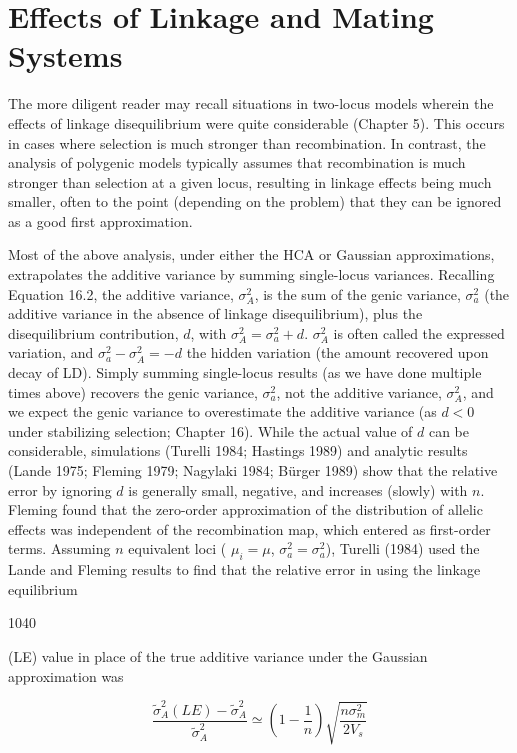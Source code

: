 \documentclass{article}
\begin{document}
\section{Effects of Linkage and Mating Systems}
The more diligent reader may recall situations in two-locus models wherein the effects of linkage disequilibrium were quite considerable (Chapter 5). This occurs in cases where selection is much stronger than recombination. In contrast, the analysis of polygenic models typically assumes that recombination is much stronger than selection at a given locus, resulting in linkage effects being much smaller, often to the point (depending on the problem) that they can be ignored as a good first approximation.

Most of the above analysis, under either the HCA or Gaussian approximations, extrapolates the additive variance by summing single-locus variances. Recalling Equation 16.2, the additive variance,  $ \sigma_A^2 $, is the sum of the genic variance,  $ \sigma_a^2 $ (the additive variance in the absence of linkage disequilibrium), plus the disequilibrium contribution,  $ d $, with  $ \sigma_A^2 = \sigma_a^2 + d $.  $ \sigma_A^2 $ is often called the expressed variation, and  $ \sigma_a^2 - \sigma_A^2 = -d $ the hidden variation (the amount recovered upon decay of LD). Simply summing single-locus results (as we have done multiple times above) recovers the genic variance,  $ \sigma_a^2 $, not the additive variance,  $ \sigma_A^2 $, and we expect the genic variance to overestimate the additive variance (as  $ d < 0 $ under stabilizing selection; Chapter 16). While the actual value of  $ d $ can be considerable, simulations (Turelli 1984; Hastings 1989) and analytic results (Lande 1975; Fleming 1979; Nagylaki 1984; Bürger 1989) show that the relative error by ignoring  $ d $ is generally small, negative, and increases (slowly) with  $ n $. Fleming found that the zero-order approximation of the distribution of allelic effects was independent of the recombination map, which entered as first-order terms. Assuming  $ n $ equivalent loci ( $ \mu_i = \mu $,  $ \sigma_a^2 = \sigma_a^2 $), Turelli (1984) used the Lande and Fleming results to find that the relative error in using the linkage equilibrium

1040

(LE) value in place of the true additive variance under the Gaussian approximation was

\begin{equation}
\frac{\widetilde{\sigma}_{A}^{2}(LE)-\widetilde{\sigma}_{A}^{2}}{\widetilde{\sigma}_{A}^{2}}\simeq\left(1-\frac{1}{n}\right)\sqrt{\frac{n\sigma_{m}^{2}}{2V_{s}}}
\tag{28.19}
\label{eq:28_19}
\end{equation}
\end{document}
